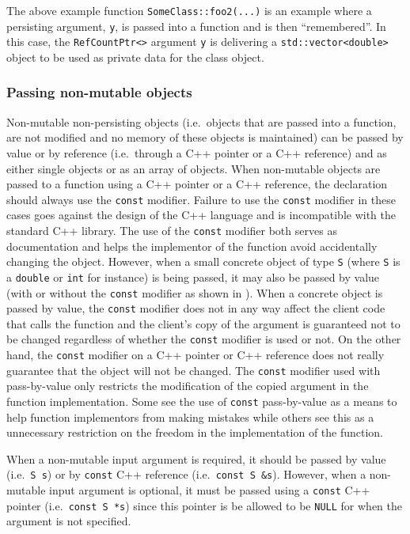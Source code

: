 {}\noindent{}The above example function
{}\texttt{SomeClass\-::foo2(...)} is an example where a persisting
argument, {}\texttt{y}, is passed into a function and is then
``remembered''.  In this case, the {}\texttt{Ref\-Count\-Ptr<>}
argument {}\texttt{y} is delivering a
{}\texttt{std\-::vector<\-double>} object to be used as private data
for the class object.

%
\subsubsection{Passing non-mutable objects}
%

Non-mutable non-persisting objects (i.e.~objects that are passed into a
function, are not modified and no memory of these objects is
maintained) can be passed by value or by reference (i.e.~through a C++
pointer or a C++ reference) and as either single objects or as an
array of objects.  When non-mutable objects are passed to a function
using a C++ pointer or a C++ reference, the declaration should always
use the {}\texttt{const} modifier.  Failure to use the
{}\texttt{const} modifier in these cases goes against the design of
the C++ language and is incompatible with the standard C++ library.
The use of the {}\texttt{const} modifier both serves as documentation
and helps the implementor of the function avoid accidentally changing
the object.  However, when a small concrete object of type
{}\texttt{S} (where {}\texttt{S} is a {}\texttt{double} or
{}\texttt{int} for instance) is being passed, it may also be passed by
value (with or without the {}\texttt{const} modifier as shown in
{}\cite[Appendix D]{ref:RefCountPtrBeginnersGuide}).  When a concrete
object is passed by value, the {}\texttt{const} modifier does not in
any way affect the client code that calls the function and the
client's copy of the argument is guaranteed not to be changed
regardless of whether the {}\texttt{const} modifier is used or not.
On the other hand, the {}\texttt{const} modifier on a C++ pointer or
C++ reference does not really guarantee that the object will not be
changed.  The {}\texttt{const} modifier used with pass-by-value only
restricts the modification of the copied argument in the function
implementation.  Some see the use of {}\texttt{const} pass-by-value as
a means to help function implementors from making mistakes while
others see this as a unnecessary restriction on the freedom in the
implementation of the function.

When a non-mutable input argument is required, it should be passed by
value (i.e.~{}\texttt{S s}) or by {}\texttt{const} C++ reference
(i.e.~{}\texttt{const S \&s}).  However, when a non-mutable input
argument is optional, it must be passed using a {}\texttt{const} C++
pointer (i.e.~{}\texttt{const S *s}) since this pointer is be allowed
to be {}\texttt{NULL} for when the argument is not specified.

